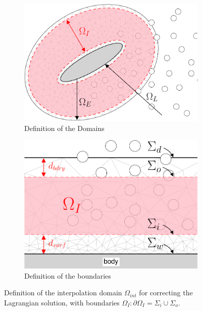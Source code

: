 	\begin{figure}[!t]
        \centering
        \begin{subfigure}[b]{0.45\textwidth}
                \includegraphics[width=\textwidth]{figures/hybrid/interpolationDomain/interpolationDomainExpanded-crop.pdf}
                \caption{Definition of the Domains}
                \label{fig:interpolationDomainExpanded}
        \end{subfigure}%
        \qquad %
        \begin{subfigure}[b]{0.45\textwidth}
                \includegraphics[width=\textwidth]{figures/hybrid/interpolationDomain/interpolationDomainCloseup-crop.pdf}
                \caption{Definition of the boundaries}
                \label{fig:interpolationDomainCloseup}
        \end{subfigure}
        \caption{Definition of the interpolation domain $\Omega_{int}$ for correcting the Lagrangian solution, with boundaries $\Omega_I: \partial\Omega_I=\Sigma_{i}\cup\Sigma_{o}$.}
        \label{fig:interpolationDomainDefinition}
	\end{figure}		

